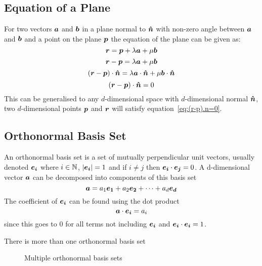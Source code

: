 \documentclass{article}
\begin{document}
    \subsection{Equation of a Plane}
    For two vectors \(\bm{a}\) and \(\bm{b}\) in a plane normal to \(\bm{\hat{n}}\) with non-zero angle between \(\bm{a}\) and \(\bm{b}\) and a point on the plane \(\bm{p}\) the equation of the plane can be given as:
    \[\bm{r} = \bm{p} +\lambda\bm{a} + \mu\bm{b}\]
    \[\bm{r} - \bm{p}= \lambda\bm{a} + \mu\bm{b}\]
    \[(\bm{r} - \bm{p})\cdot\bm{\hat{n}} = \lambda\bm{a}\cdot\bm{\hat{n}} + \mu\bm{b}\cdot\bm{\hat{n}}\]
    \begin{equation}\label{eq:(r-p).n=0}
        (\bm{r} - \bm{p})\cdot\bm{\hat{n}} = 0
    \end{equation}
    This can be generalised to any \(d\)-dimensional space with \(d\)-dimensional normal \(\bm{\hat{n}}\), two \(d\)-dimensional points \(\bm{p}\) and \(\bm{r}\) will satisfy equation~\ref{eq:(r-p).n=0}.
    
    \subsection{Orthonormal Basis Set}
    An orthonormal basis set is a set of mutually perpendicular unit vectors, usually denoted \(\bm{e_{i}}\) where \(i\in\mathbb{N}\), \(|\bm{e_{i}}|=1\) and if \(i \ne j\) then \(\bm{e_{i}}\cdot\bm{e_{j}}=0\). 
    A d-dimensional vector \(\bm{a}\) can be decomposed into components of this basis set
    \[\bm{a}=a_1\bm{e_{1}} + a_2\bm{e_{2}} +\dotsb+a_d\bm{e_{d}}\]
    The coefficient of \(\bm{e_{i}}\) can be found using the dot product
    \[\bm{a}\cdot\bm{e_{i}}=a_i\]
    since this goes to 0 for all terms not including \(\bm{e_{i}}\) and \(\bm{e_{i}}\cdot \bm{e_{i}} = 1\).
    
    There is more than one orthonormal basis set
    
    \begin{figure}[ht]
        \centering
        \caption{Multiple orthonormal basis sets}
        \label{fig:multiple orthonormal basis sets}
    \end{figure}
    
\end{document}
